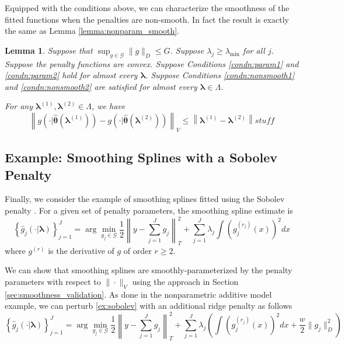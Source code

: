 \documentclass[12pt]{article}
\newtheorem{lemma}{Lemma}
\begin{document}
Equipped with the conditions above, we can characterize the smoothness of the fitted functions when the penalties are non-smooth. In fact the result is exactly the same as Lemma \ref{lemma:nonparam_smooth}.

\begin{lemma}
	\label{lemma:nonsmooth}
	Suppose that $\sup_{g\in\mathcal{G}}\|g\|_{D}\le G$.
	Suppose $\lambda_j \ge \lambda_{\min}$ for all $j$.
	Suppose the penalty functions are convex.
	Suppose Conditions \ref{condn:param1} and \ref{condn:param2} hold for almost every $\boldsymbol{\lambda}$.
	Suppose Conditions \ref{condn:nonsmooth1} and \ref{condn:nonsmooth2} are satisfied for almost every $\boldsymbol{\lambda} \in \Lambda$.
	
	For any $\boldsymbol \lambda^{(1)}, \boldsymbol \lambda^{(2)} \in \Lambda$, we have
	\[
	\left \| g \left(\cdot| \hat{\boldsymbol{\theta}}(\boldsymbol \lambda^{(1)}) \right )
	-g \left (\cdot| \hat{\boldsymbol{\theta}}(\boldsymbol \lambda^{(2)}) \right ) \right \|_V
	\le
	\left \|\boldsymbol \lambda^{(1)}- \boldsymbol \lambda^{(2)} \right \|
	stuff
	\]
\end{lemma}

\subsection{Example: Smoothing Splines with a Sobolev Penalty}

Finally, we consider the example of smoothing splines fitted using the Sobolev penalty \citep{de1978practical, wahba1990spline, green1994nonparametric}. For a given set of penalty parameters, the smoothing spline estimate is
\begin{equation}
\label{ex:sobolev}
\left \{ \hat{g}_j(\cdot | \boldsymbol \lambda) \right \}_{j=1}^J =
\arg\min_{g_j\in\mathcal{G}}
\frac{1}{2} \left \|y- \sum_{j=1}^J g_j \right \|_{T}^{2}
+ \sum_{j=1}^J \lambda_j 
\int \left (g_j^{(r_j)}(x) \right )^2 dx
\end{equation}
where $g^{(r)}$ is the derivative of $g$ of order $r \ge 2$.

We can show that smoothing splines are smoothly-parameterized by the penalty parameters with respect to $\|\cdot\|_V$ using the approach in Section \ref{sec:smoothness_validation}. As done in the nonparametric additive model example, we can perturb \eqref{ex:sobolev} with an additional ridge penalty as follows
\begin{equation}
\label{eq:sobolev_nonparam_ridge}
\left \{ \hat{g}_j(\cdot | \boldsymbol \lambda) \right \}_{j=1}^J =
\arg\min_{g_j\in\mathcal{G}}
\frac{1}{2} \left \|y- \sum_{j=1}^J g_j \right \|_{T}^{2}
+ \sum_{j=1}^J \lambda_j 
\left (
\int \left (g_j^{(r_j)}(x) \right )^2 dx
+ \frac{w}{2} \|g_j\|^2_D
\right )
\end{equation}
\end{document}
